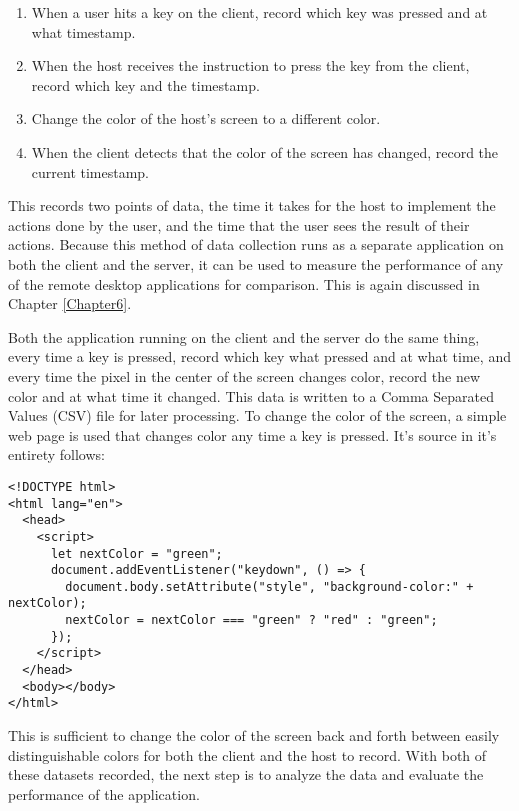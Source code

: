 \begin{enumerate}
  \item When a user hits a key on the client, record which key was pressed and at what timestamp.
  \item When the host receives the instruction to press the key from the client, record which key and the timestamp.
  \item Change the color of the host's screen to a different color.
  \item When the client detects that the color of the screen has changed, record the current timestamp.
\end{enumerate}

This records two points of data, the time it takes for the host to implement the actions done by the user, and the time that the user sees the result of their actions.
Because this method of data collection runs as a separate application on both the client and the server, it can be used to measure the performance of any of the remote desktop applications for comparison.
This is again discussed in Chapter \ref{Chapter6}.

Both the application running on the client and the server do the same thing, every time a key is pressed, record which key what pressed and at what time, and every time the pixel in the center of the screen changes color, record the new color and at what time it changed.
This data is written to a Comma Separated Values (CSV) file for later processing.
To change the color of the screen, a simple web page is used that changes color any time a key is pressed.
It's source in it's entirety follows:

\begin{lstlisting}[style=customhtml,title=\emph{/datalogger/web/index.html}]
<!DOCTYPE html>
<html lang="en">
  <head>
    <script>
      let nextColor = "green";
      document.addEventListener("keydown", () => {
        document.body.setAttribute("style", "background-color:" + nextColor);
        nextColor = nextColor === "green" ? "red" : "green";
      });
    </script>
  </head>
  <body></body>
</html>
\end{lstlisting}

This is sufficient to change the color of the screen back and forth between easily distinguishable colors for both the client and the host to record.
With both of these datasets recorded, the next step is to analyze the data and evaluate the performance of the application.